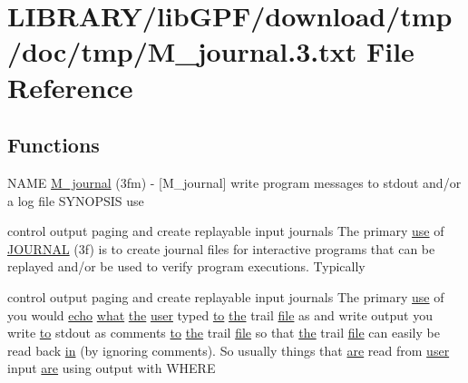 \hypertarget{M__journal_83_8txt}{}\section{L\+I\+B\+R\+A\+R\+Y/lib\+G\+P\+F/download/tmp/doc/tmp/\+M\+\_\+journal.3.txt File Reference}
\label{M__journal_83_8txt}
\subsection*{Functions}
\begin{DoxyCompactItemize}
\item 
N\+A\+ME \hyperlink{M__journal_83_8txt_afbce2a0c3f8261fe1c9d79376919174e}{M\+\_\+journal} (3fm) -\/ \mbox{[}\+M\+\_\+journal\mbox{]} write program messages to stdout and/or a log file S\+Y\+N\+O\+P\+S\+I\+S use
\item 
control output paging and create replayable input journals The primary \hyperlink{intro__blas1_83_8txt_a04fa2694d85f67a675bb3f45f7241f48}{use} of \hyperlink{M__journal_83_8txt_aee6db01e1c6132b5b3f146b5a0c6e7e1}{J\+O\+U\+R\+N\+AL} (3f) is to create journal files for interactive programs that can be replayed and/or be used to verify program executions. Typically
\item 
control output paging and create replayable input journals The primary \hyperlink{intro__blas1_83_8txt_a04fa2694d85f67a675bb3f45f7241f48}{use} of you would \hyperlink{__echo_8f90_a7b58d66872f4cd7b2249cc9d9996f08a}{echo} \hyperlink{what__overview_81_8txt_a8cdf8efd1b900d6dce77a3f97edb2216}{what} \hyperlink{M__stopwatch_83_8txt_a0f266597de2e57eb3aa964927bb30e14}{the} \hyperlink{M__stopwatch_83_8txt_ae5f4c36a1ae7eba7900823c418223f72}{user} typed \hyperlink{M__stopwatch_83_8txt_a97209fd3e34ef701c0a9734280779cbb}{to} \hyperlink{M__stopwatch_83_8txt_a0f266597de2e57eb3aa964927bb30e14}{the} trail \hyperlink{what__overview_81_8txt_a447b56c526e8da30e0dc94673727ee25}{file} as and write output you write \hyperlink{M__stopwatch_83_8txt_a97209fd3e34ef701c0a9734280779cbb}{to} stdout as comments \hyperlink{M__stopwatch_83_8txt_a97209fd3e34ef701c0a9734280779cbb}{to} \hyperlink{M__stopwatch_83_8txt_a0f266597de2e57eb3aa964927bb30e14}{the} trail \hyperlink{what__overview_81_8txt_a447b56c526e8da30e0dc94673727ee25}{file} so that \hyperlink{M__stopwatch_83_8txt_a0f266597de2e57eb3aa964927bb30e14}{the} trail \hyperlink{what__overview_81_8txt_a447b56c526e8da30e0dc94673727ee25}{file} can easily be read back \hyperlink{M__journal_83_8txt_afce72651d1eed785a2132bee863b2f38}{in} (by ignoring comments). So usually things that \hyperlink{M__stopwatch_83_8txt_a5040be02b832eba08820289c8a1f81c4}{are} read from \hyperlink{M__stopwatch_83_8txt_ae5f4c36a1ae7eba7900823c418223f72}{user} input \hyperlink{M__stopwatch_83_8txt_a5040be02b832eba08820289c8a1f81c4}{are} using output with W\+H\+E\+RE
\end{DoxyCompactItemize}
